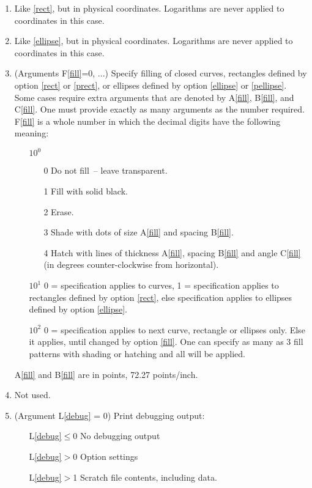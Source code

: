 \documentclass[twoside]{MATH77}
\begin{document}
\begin{multicols}{2}
\begin{enumerate}
\item\label{prect} Like \ref{rect}, but in physical coordinates.
        Logarithms are never applied to coordinates in this case.

\item\label{pellipse} Like \ref{ellipse}, but in physical coordinates.
        Logarithms are never applied to coordinates in this case.

\item\label{fill} (Arguments F\ref{fill}=0, ...) Specify filling of closed
        curves, rectangles defined by option \ref{rect} or \ref{prect}, or
        ellipses defined by option \ref{ellipse} or \ref{pellipse}.  Some
        cases require extra arguments that are denoted by A\ref{fill},
        B\ref{fill}, and C\ref{fill}.  One must provide exactly as many
        arguments as the number required.  F\ref{fill} is a whole number
        in which the decimal digits have the following meaning:
  \begin{itemize}
  \item[$10^0$]
    \begin{itemize}
    \item[0] Do not fill~-- leave transparent.
    \item[1] Fill with solid black.
    \item[2] Erase.
    \item[3] Shade with dots of size A\ref{fill} and spacing B\ref{fill}.
    \item[4] Hatch with lines of thickness A\ref{fill}, spacing
          B\ref{fill} and angle C\ref{fill} (in degrees counter-clockwise
          from horizontal).
    \end{itemize}
  \item[$10^1$] 0 = specification applies to curves, 1 = specification
        applies to rectangles defined by option \ref{rect}, else
        specification applies to ellipses defined by option \ref{ellipse}.
  \item[$10^2$] 0 = specification applies to next curve, rectangle or
        ellipses only.  Else it applies, until changed by option
        \ref{fill}.  One can specify as many as 3 fill patterns with
        shading or hatching and all will be applied.
  \end{itemize}
        A\ref{fill} and B\ref{fill} are in points, 72.27 points/inch.

\item\label{nouse_2}   Not used.

\item\label{debug} (Argument L\ref{debug} = 0)  Print debugging output:
  \begin{itemize}
  \item[L\ref{debug}$\leq$0]  No debugging output
  \item[L\ref{debug}$>$0]  Option settings
  \item[L\ref{debug}$>$1]  Scratch file contents, including data.
  \end{itemize}
\end{enumerate}
\renewcommand{\labelenumi}{\theenumi}


\end{multicols}
\end{document}
